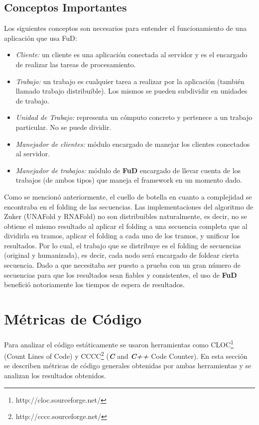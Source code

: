 \subsection{Conceptos Importantes}
Los siguientes conceptos son necesarios para entender el funcionamiento de una aplicación que usa FuD:
\begin{itemize}
	\item \emph{Cliente:} un cliente es una aplicación conectada al servidor y es el encargado de realizar las tareas de procesamiento.
 	\item \emph{Trabajo:} un trabajo es cualquier tarea a realizar por la aplicación (también llamado trabajo distribuible). Los mismos se
 						  pueden subdividir en unidades de trabajo.
 	\item \emph{Unidad de Trabajo:} representa un cómputo concreto y pertenece a un trabajo particular. No se puede dividir.
 	\item \emph{Manejador de clientes:} módulo encargado de manejar los clientes conectados al servidor.
 	\item \emph{Manejador de trabajos:} módulo de \textbf{FuD} encargado de llevar cuenta de los trabajos (de ambos tipos) que maneja el
 										framework en un momento dado.
 \end{itemize}

\par Como se mencionó anteriormente, el cuello de botella en cuanto a complejidad se encontraba en el folding de las secuencias. Las implementaciones del algoritmo de Zuker (UNAFold y RNAFold) no son distribuibles naturalmente, es decir, no se obtiene el mismo resultado al aplicar el folding a una secuencia completa que al dividirla en tramos, aplicar el folding a cada uno de los tramos, y unificar los resultados. Por lo cual, el trabajo que se distribuye es el folding de secuencias (original y humanizada), es decir, cada nodo será encargado de foldear cierta secuencia. 
Dado a que \remo necesitaba ser puesto a prueba con un gran número de secuencias para que los resultados sean fiables y consistentes, el uso de \textbf{FuD} benefició notoriamente los tiempos de espera de resultados.

\section{Métricas de Código}
\par Para analizar el código estáticamente se usaron herramientas como CLOC\footnote{http://cloc.sourceforge.net/} (Count Lines of Code) y CCCC\footnote{http://cccc.sourceforge.net/} (\textbf{\textit{C}} and \textbf{\textit{C++}} Code Counter). En esta sección se describen métricas de código generales obtenidas por ambas herramientas y se analizan los resultados obtenidos.

